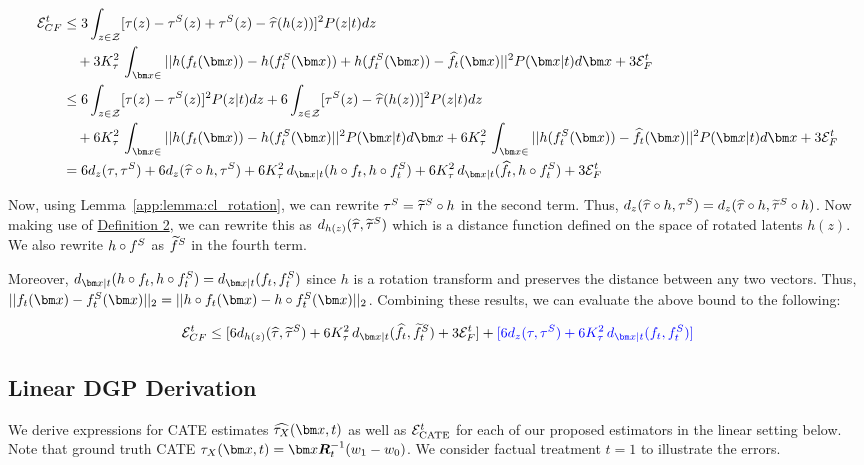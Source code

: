 \begin{align*}
    \ErrCF^t &\leq 3\int_{z \in \Zspace}[\tau(z) - \syntau(z) + \syntau(z) - \tauhat(h(z))]^2 P(z|t)dz 
    \\ &\quad+3 K_{\tau}^2 \,\int_{\xb \in \xspace}||h(\RInv_t(\xb)) - h(\SInv_t(\xb)) + h(\SInv_t(\xb)) - \RInvhat_t(\xb)||^2 P(\xb|t)d\xb + 3\ErrF^t\\
    &\leq 6\int_{z \in \Zspace}[\tau(z) - \syntau(z)]^2P(z|t)dz + 6\int_{z \in \Zspace}[\syntau(z) - \tauhat(h(z))]^2 P(z|t)dz 
    \\ &\quad + 6 K_{\tau}^2 \,\int_{\xb \in \xspace}||h(\RInv_t(\xb)) - h(\SInv_t(\xb)||^2 P(\xb|t)d\xb + 6 K_{\tau}^2 \,\int_{\xb \in \xspace}||h(\SInv_t(\xb)) - \RInvhat_t(\xb)||^2 P(\xb|t)d\xb + 3\ErrF^t\\
    &= 6 d_z(\tau, \syntau) + 6d_z(\tauhat\circ h, \syntau) + 6 K_{\tau}^2 \,d_{\xb|t}(h \circ \RInv_t,h \circ \SInv_t) + 6 K_{\tau}^2 \,d_{\xb|t}(\RInvhat_t,h \circ \SInv_t) + 3\ErrF^t\\
\end{align*}

Now, using Lemma~\ref{app:lemma:cl_rotation}, we can rewrite $\tau^S = \widetilde{\tau}^S \circ h$ in the second term. Thus, $d_z(\widehat{\tau}\circ h, \tau^S) = d_z(\widehat{\tau}\circ h, \widetilde{\tau}^S \circ h)$. Now making use of \hyperlink{def:dz}{Definition 2}, we can rewrite this as $d_{h(z)}(\widehat{\tau}, \widetilde{\tau}^S)$ which is a distance function defined on the space of rotated latents $h(z)$. We also rewrite $h \circ f^S$ as $\widetilde{f}^S$ in the fourth term.

Moreover, $d_{\xb|t}(h \circ \RInv_t,h \circ \SInv_t) = d_{\xb|t}(\RInv_t, \SInv_t)$ since $h$ is a rotation transform and preserves the distance between any two vectors. Thus, $||\RInv_t(\xb) - \SInv_t(\xb)||_2 = ||h \circ \RInv_t(\xb) - h \circ \SInv_t(\xb)||_2$. Combining these results, we can evaluate the above bound to the following:

\begin{align*}
      \ErrCF^t  &\leq [6d_{h(z)}(\tauhat, \syntauTilde) + 6 K_{\tau}^2 \,d_{\xb|t}(\RInvhat_t,\SInvTilde_t) + 3\ErrF^t] + \textcolor{blue}{[6 d_z(\tau, \syntau) + 6 K_{\tau}^2 \,d_{\xb|t}(\RInv_t,\SInv_t)]}\\
\end{align*}




\subsection{Linear DGP Derivation}
\label{app:linear_dgp}
We derive expressions for CATE estimates $\ITExhat(\xb, t)$ as well as $\mathcal{E}_{\text{CATE}}^t$ for each of our proposed estimators in the linear setting below. Note that ground truth CATE $\ITEx(\xb, t) = \xb \mat{R}_t^{-1} (\wbeta{1} - \wbeta{0})$. We consider factual treatment $t=1$ to illustrate the errors.

